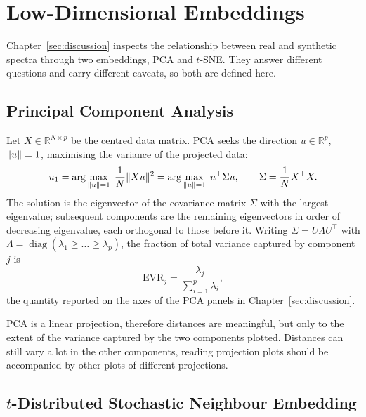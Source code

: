 \section{Low-Dimensional Embeddings}
\label{sec:embeddings}

Chapter~\ref{sec:discussion} inspects the relationship between real and synthetic spectra
through two embeddings, PCA and $t$-SNE. They answer different questions and carry different
caveats, so both are defined here.

\subsection*{Principal Component Analysis}

Let $X \in \mathbb{R}^{N \times p}$ be the centred data matrix. PCA seeks the direction
$u \in \mathbb{R}^{p}$, $\lVert u\rVert = 1$, maximising the variance of the projected data:
\begin{equation}
u_1 = \arg\max_{\lVert u\rVert=1} \; \frac{1}{N} \lVert X u\rVert^2
    = \arg\max_{\lVert u\rVert=1} \; u^\top \Sigma u,
\qquad \Sigma = \frac{1}{N} X^\top X .
\label{eq:pca_objective}
\end{equation}
The solution is the eigenvector of the covariance matrix $\Sigma$ with the largest eigenvalue;
subsequent components are the remaining eigenvectors in order of decreasing eigenvalue, each
orthogonal to those before it. Writing $\Sigma = U \Lambda U^\top$ with
$\Lambda = \operatorname{diag}(\lambda_1 \ge \dots \ge \lambda_p)$, the fraction of total
variance captured by component $j$ is
\begin{equation}
\text{EVR}_j = \frac{\lambda_j}{\sum_{i=1}^{p} \lambda_i},
\label{eq:evr}
\end{equation}
the quantity reported on the axes of the PCA panels in Chapter~\ref{sec:discussion}.

PCA is a linear projection, therefore distances are meaningful, but only to the extent of the variance captured by the two components plotted. Distances can still vary a lot in the other components, reading projection plots should be accompanied by other plots of different projections.

\subsection*{$t$-Distributed Stochastic Neighbour Embedding}

